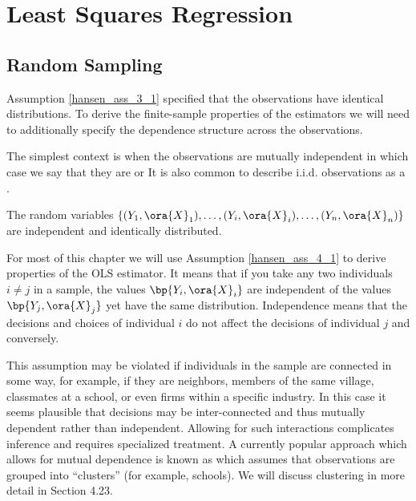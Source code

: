 
\chapter{Least Squares Regression}


\setcounter{section}{0}
\section{Random Sampling}

Assumption \ref{hansen_ass_3_1} specified that the observations have identical distributions. To derive the finite-sample properties of the estimators we will need to additionally specify the dependence structure across the observations. 

The simplest context is when the observations are mutually independent in which case we say that they are  or  It is also common to describe i.i.d. observations as a .

\begin{assumption}

    The random variables $\left\{(Y_1, \ora{X}_1), \ldots, (Y_i, \ora{X}_i), \ldots, (Y_n, \ora{X}_n)\right\}$ are independent and identically distributed.

    \label{hansen_ass_4_1}
\end{assumption}

For most of this chapter we will use Assumption \ref{hansen_ass_4_1} to derive properties of the OLS estimator. It means that if you take any two individuals $i \neq j$ in a sample, the values $\bp{Y_i, \ora{X}_i}$ are independent of the values $\bp{Y_j, \ora{X}_j}$ yet have the same distribution. Independence means that the decisions and choices of individual $i$ do not affect the decisions of individual $j$ and conversely.

This assumption may be violated if individuals in the sample are connected in some way, for example, if they are neighbors, members of the same village, classmates at a school, or even firms within a specific industry. In this case it seems plausible that decisions may be inter-connected and thus mutually dependent rather than independent. Allowing for such interactions complicates inference and requires specialized treatment. A currently popular approach which allows for mutual dependence is known as  which assumes that observations are grouped into ``clusters'' (for example, schools). We will discuss clustering in more detail in Section 4.23.

